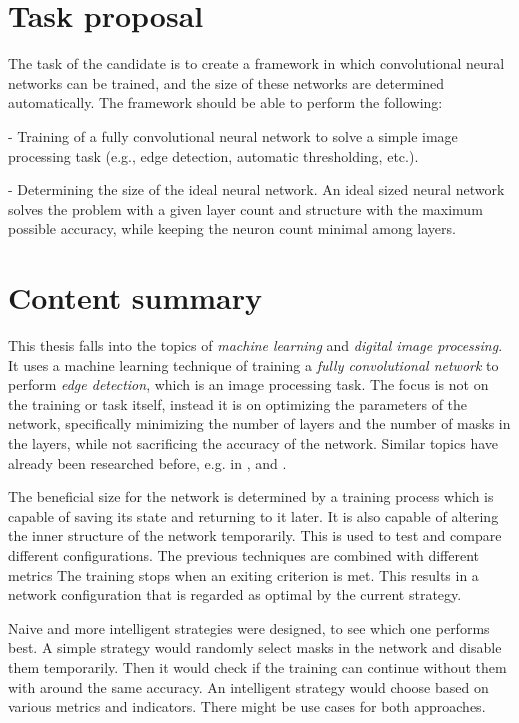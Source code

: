 \documentclass[12pt]{report}
\begin{document}
\chapter*{Task proposal}

The task of the candidate is to create a framework in which convolutional neural networks can be trained, and the size of these networks are determined automatically. The framework should be able to perform the following:

- Training of a fully convolutional neural network to solve a simple image processing task (e.g., edge detection, automatic thresholding, etc.).

- Determining the size of the ideal neural network. An ideal sized neural network solves the problem with a given layer count and structure with the maximum possible accuracy, while keeping the neuron count minimal among layers.

\chapter*{Content summary}

This thesis falls into the topics of \textit{machine learning} and \textit{digital image processing}. It uses a machine learning technique of training a \textit{fully convolutional network} to perform \textit{edge detection}, which is an image processing task. The focus is not on the training or task itself, instead it is on optimizing the parameters of the network, specifically minimizing the number of layers and the number of masks in the layers, while not sacrificing the accuracy of the network. Similar topics have already been researched before, e.g. in \cite{pruning_web}, \cite{pruning_arxiv} and \cite{understanding}.


The beneficial size for the network is determined by a training process which is capable of saving its state and returning to it later. It is also capable of altering the inner structure of the network temporarily. This is used to test and compare different configurations. The previous techniques are combined with different metrics The training stops when an exiting criterion is met. This results in a network configuration that is regarded as optimal by the current strategy.

Naive and more intelligent strategies were designed, to see which one performs best. A simple strategy would randomly select masks in the network and disable them temporarily. Then it would check if the training can continue without them with around the same accuracy. An intelligent strategy would choose based on various metrics and indicators. There might be use cases for both approaches.
\end{document}
